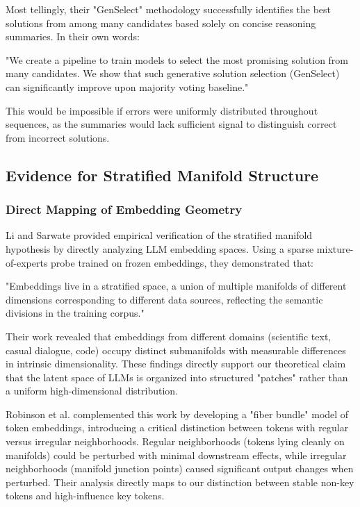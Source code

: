 \documentclass{article}
\begin{document}
Most tellingly, their "GenSelect" methodology successfully identifies the best solutions from among many candidates based solely on concise reasoning summaries. In their own words:

"We create a pipeline to train models to select the most promising solution from many candidates. We show that such generative solution selection (GenSelect) can significantly improve upon majority voting baseline." \citep{moshkov2025aimo}

This would be impossible if errors were uniformly distributed throughout sequences, as the summaries would lack sufficient signal to distinguish correct from incorrect solutions.

\subsection{Evidence for Stratified Manifold Structure}

\subsubsection{Direct Mapping of Embedding Geometry}

Li and Sarwate \citep{li2025unraveling} provided empirical verification of the stratified manifold hypothesis by directly analyzing LLM embedding spaces. Using a sparse mixture-of-experts probe trained on frozen embeddings, they demonstrated that:

"Embeddings live in a stratified space, a union of multiple manifolds of different dimensions corresponding to different data sources, reflecting the semantic divisions in the training corpus." \citep{li2025unraveling}

Their work revealed that embeddings from different domains (scientific text, casual dialogue, code) occupy distinct submanifolds with measurable differences in intrinsic dimensionality. These findings directly support our theoretical claim that the latent space of LLMs is organized into structured "patches" rather than a uniform high-dimensional distribution.

Robinson et al. \citep{robinson2025token} complemented this work by developing a "fiber bundle" model of token embeddings, introducing a critical distinction between tokens with regular versus irregular neighborhoods. Regular neighborhoods (tokens lying cleanly on manifolds) could be perturbed with minimal downstream effects, while irregular neighborhoods (manifold junction points) caused significant output changes when perturbed. Their analysis directly maps to our distinction between stable non-key tokens and high-influence key tokens.
\end{document}
